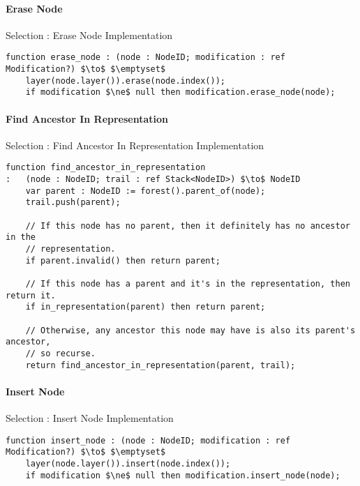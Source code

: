 \paragraph{Erase Node}

\begin{stulisting}[H]
\caption{Selection : Erase Node Implementation}
\begin{lstlisting}[style=Default]
function erase_node : (node : NodeID; modification : ref Modification?) $\to$ $\emptyset$
	layer(node.layer()).erase(node.index());
	if modification $\ne$ null then modification.erase_node(node);
\end{lstlisting}
\end{stulisting}

\paragraph{Find Ancestor In Representation}

\begin{stulisting}[H]
\caption{Selection : Find Ancestor In Representation Implementation}
\begin{lstlisting}[style=Default]
function find_ancestor_in_representation
:	(node : NodeID; trail : ref Stack<NodeID>) $\to$ NodeID
	var parent : NodeID := forest().parent_of(node);
	trail.push(parent);

	// If this node has no parent, then it definitely has no ancestor in the
	// representation.
	if parent.invalid() then return parent;

	// If this node has a parent and it's in the representation, then return it.
	if in_representation(parent) then return parent;

	// Otherwise, any ancestor this node may have is also its parent's ancestor,
	// so recurse.
	return find_ancestor_in_representation(parent, trail);
\end{lstlisting}
\end{stulisting}

\paragraph{Insert Node}

\begin{stulisting}[H]
\caption{Selection : Insert Node Implementation}
\begin{lstlisting}[style=Default]
function insert_node : (node : NodeID; modification : ref Modification?) $\to$ $\emptyset$
	layer(node.layer()).insert(node.index());
	if modification $\ne$ null then modification.insert_node(node);
\end{lstlisting}
\end{stulisting}

